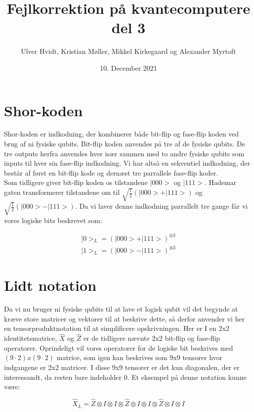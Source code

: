 \documentclass[a4paper,oneside,article]{memoir}
\begin{document}
\author{Ulver Hvidt, Kristian Møller, Mikkel Kirkegaard og Alexander Myrtoft}
\title{Fejlkorrektion på kvantecomputere del 3}
\date{10. December 2021}
\maketitle   %


\section{Shor-koden}
Shor-koden er indkodning, der kombinerer både bit-flip og fase-flip koden ved brug af ni fysiske qubits. Bit-flip koden anvendes på tre af de fysiske qubits. De tre outputs herfra anvendes hver især sammen med to andre fysiske qubits som inputs til hver sin fase-flip indkodning. Vi har altså en sekventiel indkodning, der består af først en bit-flip kode og dernæst tre parrallele fase-flip koder.\\

Som tidligere giver bit-flip koden os tilstandene $|000>$ og $|111>$. Hademar gaten transformerer tilstandene om til $\sqrt{\frac{1}{2}} (|000> + |111>)$ og $\sqrt{\frac{1}{2}} (|000> - |111>)$. Da vi laver denne indkodning parrallelt tre gange får vi vores logiske bits beskrevet som:

\begin{align}
    |0>_L = (|000> + |111>)^{\otimes 3}\\
    |1>_L = (|000> - |111>)^{\otimes 3}
\end{align}

\section{Lidt notation}
Da vi nu bruger ni fysiske qubits til at lave et logisk qubit vil det begynde at kræve store matricer og vektorer til at beskrive dette, så derfor anvender vi her en tensorproduktnotation til at simplificere opskrivningen. Her er I en 2x2 identitetsmatrice, $\hat{X}$ og $\hat{Z}$ er de tidligere nævnte 2x2 bit-flip og fase-flip operatorer. Oprindeligt vil vores operatorer for de logiske bit beskrives med $(9 \cdot 2)x(9 \cdot 2)$ matrice, som igen kan beskrives som 9x9 tensorer hvor indgangene er 2x2 matricer. I disse 9x9 tensorer er det kun diagonalen, der er interessandt, da resten bare indeholder 0. Et eksempel på denne notation kunne være:

\begin{equation}
    \hat{X}_L = \hat{Z} \otimes I \otimes I \otimes \hat{Z} \otimes I \otimes I \otimes \hat{Z} \otimes I \otimes I
\end{equation}
\end{document}
